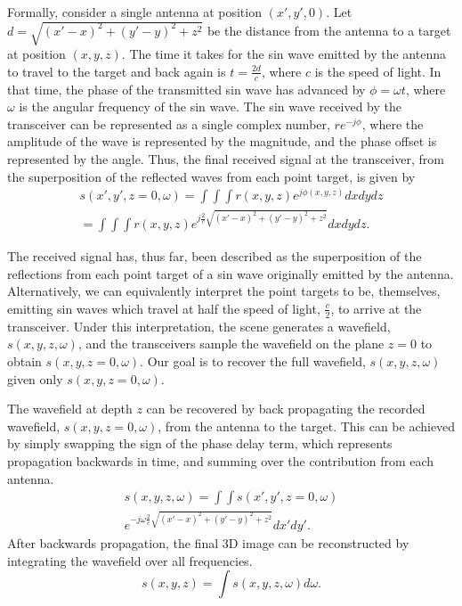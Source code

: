 \documentclass[twocolumn]{article}
\begin{document}
Formally, consider a single antenna at position $(x', y', 0)$. Let $d = \sqrt{(x'-x)^2+(y'-y)^2+z^2}$ be the distance from the antenna to a target at position $(x,y,z)$. The time it takes for the sin wave emitted by the antenna to travel to the target and back again is $t = \frac{2d}{c}$, where $c$ is the speed of light. In that time, the phase of the transmitted sin wave has advanced by $\phi = \omega t$, where $\omega$ is the angular frequency of the sin wave. The sin wave received by the transceiver can be represented as a single complex number, $r e^{-j \phi}$, where the amplitude of the wave is represented by the magnitude, and the phase offset is represented by the angle. Thus, the final received signal at the transceiver, from the superposition of the reflected waves from each point target, is given by
%
\begin{gather}
s(x', y', z=0, \omega) = \int \int \int r(x,y,z) e^{j \phi(x,y,z)} dx dy dz \nonumber \\
= \int \int \int r(x,y,z) e^{j \frac{2}{c} \sqrt{(x'-x)^2 + (y'-y)^2 + z^2}} dx dy dz.
\end{gather}

The received signal has, thus far, been described as the superposition of the reflections from each point target of a sin wave originally emitted by the antenna. Alternatively, we can equivalently interpret the point targets to be, themselves, emitting sin waves which travel at half the speed of light, $\frac{c}{2}$, to arrive at the transceiver. Under this interpretation, the scene generates a wavefield, $s(x,y,z,\omega)$, and the transceivers sample the wavefield on the plane $z=0$ to obtain $s(x,y,z=0,\omega)$. Our goal is to recover the full wavefield, $s(x,y,z,\omega)$ given only $s(x,y,z=0,\omega)$.

The wavefield at depth $z$ can be recovered by back propagating the recorded wavefield, $s(x, y, z=0, \omega)$, from the antenna to the target. This can be achieved by simply swapping the sign of the phase delay term, which represents propagation backwards in time, and summing over the contribution from each antenna.
%
\begin{gather}
s(x,y,z,\omega) =\int\int s(x',y',z=0,\omega) \nonumber \\
e^{-j \omega \frac{2}{c} \sqrt{(x'-x)^{2}+(y'-y)^{2}+z^{2}}} dx'dy'.
\end{gather}
%
After backwards propagation, the final 3D image can be reconstructed by integrating the wavefield over all frequencies.
\begin{equation}
s(x,y,z)=\int s(x,y,z,\omega) d\omega.
\end{equation}
\end{document}
